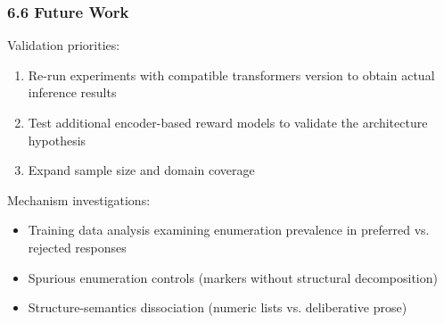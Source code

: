 \subsubsection{6.6 Future Work}

Validation priorities:
\begin{enumerate}
\item Re-run experiments with compatible transformers version to obtain actual inference results
\item Test additional encoder-based reward models to validate the architecture hypothesis
\item Expand sample size and domain coverage
\end{enumerate}

Mechanism investigations:
\begin{itemize}
\item Training data analysis examining enumeration prevalence in preferred vs. rejected responses
\item Spurious enumeration controls (markers without structural decomposition)
\item Structure-semantics dissociation (numeric lists vs. deliberative prose)
\end{itemize}
